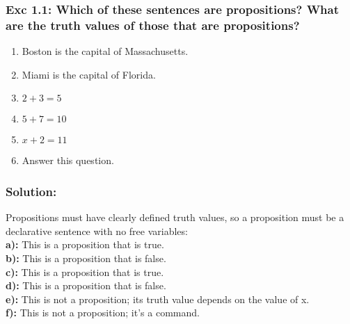 \subsubsection*{Exc 1.1: Which of these sentences are propositions? What are the
truth values of those that are propositions?}
\begin{enumerate}[label=(\alph*)]
\item Boston is the capital of Massachusetts.
\item Miami is the capital of Florida.
\item $2+3=5$
\item $5+7=10$
\item $x+2 = 11$
\item Answer this question.
\end{enumerate}
\subsubsection*{Solution:}
Propositions must have clearly defined truth values, so a proposition must be a declarative sentence with no
free variables:
\\
\textbf{a):} This is a proposition that is true.
\\
\textbf{b):} This is a proposition that is false.
\\
\textbf{c):} This is a proposition that is true.
\\
\textbf{d):} This is a proposition that is false.
\\
\textbf{e):} This is not a proposition; its truth value depends on the value of x.
\\
\textbf{f):} This is not a proposition; it’s a command.